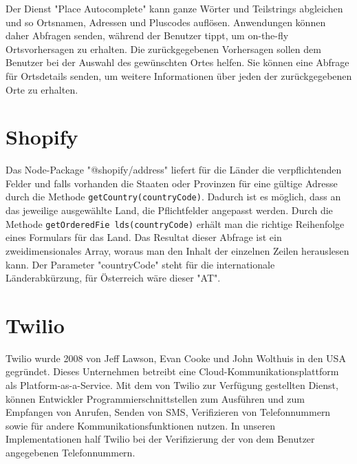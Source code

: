 Der Dienst "Place Autocomplete" kann ganze Wörter und Teilstrings abgleichen und so Ortsnamen, Adressen und Pluscodes auflösen. Anwendungen können daher Abfragen senden, während der Benutzer tippt, um on-the-fly Ortsvorhersagen zu erhalten. Die zurückgegebenen Vorhersagen sollen dem Benutzer bei der Auswahl des gewünschten Ortes helfen. Sie können eine Abfrage für Ortsdetails senden, um weitere Informationen über jeden der zurückgegebenen Orte zu erhalten.\cite{googlePlacesAPI}

\newpage

\section{Shopify}
Das Node-Package "@shopify/address" liefert für die Länder die verpflichtenden Felder und falls vorhanden die Staaten oder Provinzen für eine gültige Adresse durch die Methode \texttt{getCountry(countryCode)}. Dadurch ist es möglich, dass an das jeweilige ausgewählte Land, die Pflichtfelder angepasst werden. Durch die Methode \texttt{getOrderedFie lds(countryCode)} erhält man die richtige Reihenfolge eines Formulars für das Land. Das Resultat dieser Abfrage ist ein zweidimensionales Array, woraus man den Inhalt der einzelnen Zeilen herauslesen kann. Der Parameter "countryCode" steht für die internationale Länderabkürzung, für Österreich wäre dieser "AT". \autocite{shopifyNPM}

\section{Twilio} \label{sec:twilio}
Twilio wurde 2008 von Jeff Lawson, Evan Cooke und John Wolthuis in den USA gegründet. Dieses Unternehmen betreibt eine Cloud-Kommunikationsplattform als Platform-as-a-Service. Mit dem von Twilio zur Verfügung gestellten Dienst, können Entwickler Programmierschnittstellen zum Ausführen und zum Empfangen von Anrufen, Senden von SMS, Verifizieren von Telefonnummern sowie für andere Kommunikationsfunktionen nutzen. In unseren Implementationen half Twilio bei der Verifizierung der von dem Benutzer angegebenen Telefonnummern. \cite{twilioWebsite}

